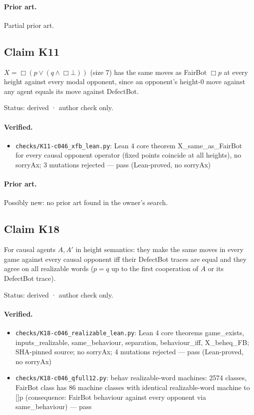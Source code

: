 \documentclass{article}
\begin{document}
\paragraph{Prior art.} Partial prior art.

\subsection*{Claim K11}

$X=\Box(p\vee(q\wedge\Box\bot))$ (size 7) has the same moves as FairBot $\Box p$ at every height against every modal opponent, since an opponent's height-0 move against any agent equals its move against DefectBot.

Status: derived · author check only.

\paragraph{Verified.}
\begin{itemize}
\item \texttt{checks/K11-c046\_xfb\_lean.py}: Lean 4 core theorem X\_same\_as\_FairBot for every causal opponent operator (fixed points coincide at all heights), no sorryAx; 3 mutations rejected --- pass (Lean-proved, no sorryAx)
\end{itemize}

\paragraph{Prior art.} Possibly new: no prior art found in the owner's search.

\subsection*{Claim K18}

For causal agents $A,A'$ in height semantics: they make the same moves in every game against every causal opponent iff their DefectBot traces are equal and they agree on all realizable words ($p=q$ up to the first cooperation of $A$ or its DefectBot trace).

Status: derived · author check only.

\paragraph{Verified.}
\begin{itemize}
\item \texttt{checks/K18-c046\_realizable\_lean.py}: Lean 4 core theorems game\_exists, inputs\_realizable, same\_behaviour, separation, behaviour\_iff, X\_beheq\_FB; SHA-pinned source; no sorryAx; 4 mutations rejected --- pass (Lean-proved, no sorryAx)
\item \texttt{checks/K18-c046\_qfull12.py}: behav realizable-word machines: 2574 classes, FairBot class has 86 machine classes with identical realizable-word machine to []p (consequence: FairBot behaviour against every opponent via same\_behaviour) --- pass
\end{itemize}
\end{document}

